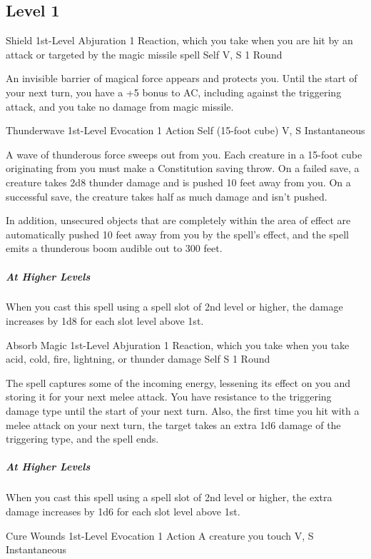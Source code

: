 {\subsection*{Level 1}

\DndSpellHeader
  {Shield}
  {1st-Level Abjuration}
  {1 Reaction, which you take when you are hit by an attack or targeted by the magic missile spell}
  {Self}
  {V, S}
  {1 Round}

An invisible barrier of magical force appears and protects you. Until the start of your next turn, you have a +5 bonus to AC, including against the triggering attack, and you take no damage from magic missile.

\DndSpellHeader
  {Thunderwave}
  {1st-Level Evocation}
  {1 Action}
  {Self (15-foot cube)}
  {V, S}
  {Instantaneous}

A wave of thunderous force sweeps out from you. Each creature in a 15-foot cube originating from you must make a Constitution saving throw. On a failed save, a creature takes 2d8 thunder damage and is pushed 10 feet away from you. On a successful save, the creature takes half as much damage and isn’t pushed.

In addition, unsecured objects that are completely within the area of effect are automatically pushed 10 feet away from you by the spell’s effect, and the spell emits a thunderous boom audible out to 300 feet.

\subparagraph*{At Higher Levels} When you cast this spell using a spell slot of 2nd level or higher, the damage increases by 1d8 for each slot level above 1st.

\DndSpellHeader
  {Absorb Magic}
  {1st-Level Abjuration}
  {1 Reaction, which you take when you take acid, cold, fire, lightning, or thunder damage}
  {Self}
  {S}
  {1 Round}
  
The spell captures some of the incoming energy, lessening its effect on you and storing it for your next melee attack. You have resistance to the triggering damage type until the start of your next turn. Also, the first time you hit with a melee attack on your next turn, the target takes an extra 1d6 damage of the triggering type, and the spell ends.

\subparagraph*{At Higher Levels} When you cast this spell using a spell slot of 2nd level or higher, the extra damage increases by 1d6 for each slot level above 1st.

\DndSpellHeader
  {Cure Wounds}
  {1st-Level Evocation}
  {1 Action}
  {A creature you touch}
  {V, S}
  {Instantaneous}
  
}
